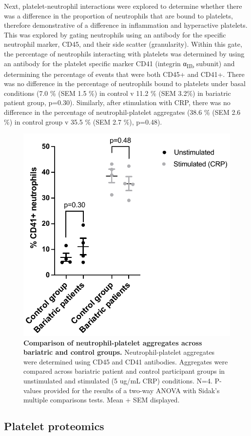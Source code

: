 \documentclass[11pt,twoside]{bristolthesis}
\begin{document}
Next, platelet-neutrophil interactions were explored to determine whether there was a difference in the proportion of neutrophils that are bound to platelets, therefore demonstrative of a difference in inflammation and hyperactive platelets. This was explored by gating neutrophils using an antibody for the specific neutrophil marker, CD45, and their side scatter (granularity). Within this gate, the percentage of neutrophils interacting with platelets was determined by using an antibody for the platelet specific marker CD41 (integrin α\textsubscript{IIb} subunit) and determining the percentage of events that were both CD45+ and CD41+. There was no difference in the percentage of neutrophils bound to platelets under basal conditions (7.0 \% (SEM 1.5 \%) in control v 11.2 \% (SEM 3.2\%) in bariatric patient group, p=0.30). Similarly, after stimulation with CRP, there was no difference in the percentage of neutrophil-platelet aggregates (38.6 \% (SEM 2.6 \%) in control group v 35.5 \% (SEM 2.7 \%), p=0.48).



\begin{figure}
\includegraphics[width=0.7\linewidth]{figure/Bariatric_study/Plt-neu_aggregates} \caption[Comparison of neutrophil-platelet aggregates across bariatric and control groups.]{\textbf{Comparison of neutrophil-platelet aggregates across bariatric and control groups.} Neutrophil-platelet aggregates were determined using CD45 and CD41 antibodies. Aggregates were compared across bariatric patient and control participant groups in unstimulated and stimulated (5 ug/mL CRP) conditions. N=4. P-values provided for the results of a two-way ANOVA with Sidak's multiple comparisons tests. Mean + SEM displayed.}\label{fig:platelet-neutrophil}
\end{figure}
\hypertarget{platelet-proteomics}{%
\subsection{Platelet proteomics}\label{platelet-proteomics}}
\end{document}
